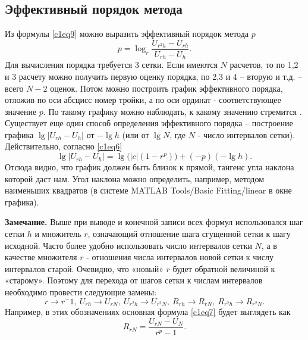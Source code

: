 \subsection{Эффективный порядок метода}
Из формулы \eqref{c1eq9} можно выразить эффективный порядок метода $p$
\begin{equation} \label{c1eq13}
p = \log_r \frac{U_{r^2h} - U_{rh}}{U_{rh} - U_h}.
\end{equation}
Для вычисления порядка требуется 3 сетки. Если имеются $N$ расчетов, то по 1,2 и 3 расчету можно получить первую оценку порядка, по 2,3 и 4 – вторую и т.д. – всего $N-2$ оценок. Потом можно построить график эффективного порядка, отложив по оси абсцисс номер тройки, а по оси ординат - соответствующее значение $p$. По такому графику можно наблюдать, к какому значению стремится .
Существует еще один способ определения эффективного порядка – построение графика $\lg\left| U_{rh} - U_h \right|$ от $-\lg h$ (или от $\lg N$, где $N$ - число интервалов сетки). Действительно, согласно \eqref{c1eq6}
\begin{equation} \label{c1eq14}
\lg \left| U_{rh} - U_h \right| = \lg \big( \left| c \right| \left( 1 - r^p \right) \big) + \left( -p \right) \left( - \lg h \right).
\end{equation}
Отсюда видно, что график должен быть близок к прямой, тангенс угла наклона которой даст нам. Угол наклона можно определить, например, методом наименьших квадратов (в системе MATLAB Tools/Basic Fitting/linear в окне графика). 

\textbf{Замечание.} Выше при выводе и конечной записи всех формул использовался шаг сетки $h$ и множитель $r$, означающий отношение шага сгущенной сетки к шагу исходной. Часто более удобно использовать число интервалов сетки $N$, а в качестве множителя $r$ - отношения числа интервалов новой сетки к числу интервалов старой. Очевидно, что «новый» $r$ будет обратной величиной к «старому». Поэтому для перехода от шагов сетки к  числам интервалов необходимо провести следующие замены:
\begin{equation} \label{c1eq15}
r \rightarrow r^-1, \ U_{rh} \rightarrow U_{rN}, \ U_{r^2h} \rightarrow U_{r^2N}, \ R_{rh} \rightarrow R_{rN}, \ R_{r^2h} \rightarrow R_{r^2N}.
\end{equation}
Например, в этих обозначениях основная формула \eqref{c1eq7} будет выглядеть как
\begin{equation} \label{c1eq16}
R_{rN} = \frac{U_{rN} - U_N}{r^p - 1}.
\end{equation}

